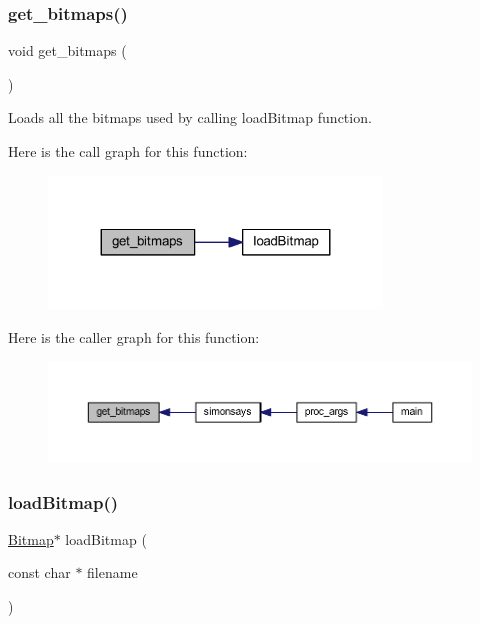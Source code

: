 \subsubsection{\texorpdfstring{get\+\_\+bitmaps()}{get\_bitmaps()}}
{\footnotesize\ttfamily void get\+\_\+bitmaps (\begin{DoxyParamCaption}{ }\end{DoxyParamCaption})}



Loads all the bitmaps used by calling load\+Bitmap function. 

Here is the call graph for this function\+:\nopagebreak
\begin{figure}[H]
\begin{center}
\leavevmode
\includegraphics[width=251pt]{group___bitmap_gabda6654c65348aa9c06a9ae0e9562b9a_cgraph}
\end{center}
\end{figure}
Here is the caller graph for this function\+:\nopagebreak
\begin{figure}[H]
\begin{center}
\leavevmode
\includegraphics[width=350pt]{group___bitmap_gabda6654c65348aa9c06a9ae0e9562b9a_icgraph}
\end{center}
\end{figure}
\mbox{\label{group___bitmap_ga3506880ffd407c36eb8aaddd2c1606d2}} 
\subsubsection{\texorpdfstring{load\+Bitmap()}{loadBitmap()}}
{\footnotesize\ttfamily \hyperlink{struct_bitmap}{Bitmap}$\ast$ load\+Bitmap (\begin{DoxyParamCaption}\item[{const char $\ast$}]{filename }\end{DoxyParamCaption})}



